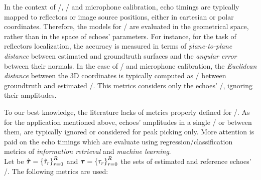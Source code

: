 \mynewline
In the context of \RooGE/, \SSL/ and microphone calibration, echo timings are typically mapped to reflectors or image source positions, either in cartesian or polar coordinates.
Therefore, the models for \AER/ are evaluated in the geometrical space, rather than in the space of echoes' parameters.
For instance, for the task of reflectors localization, the accuracy is measured in terms of \textit{plane-to-plane distance} between estimated and groundtruth surfaces and the \textit{angular error} between their normals.
In the case of \SSL/ and microphone calibration, the \textit{Euclidean distance} between the 3D coordinates is typically computed as \RMSEtxt/ between groundtruth and estimated \DOAs/.
This metrics considers only the echoes' \TOA/, ignoring their amplitudes.

\mynewline
To our best knowledge, the literature lacks of metrics properly defined for \AER/.
As for the application mentioned above, echoes' amplitudes in a single \RIR/ or between them, are typically ignored or considered for peak picking only.
More attention is paid on the echo timings which are evaluate using regression/classification metrics of \textit{information retrieval} and \textit{machine learning}.
\\Let be $\hat{\boldsymbol{\tau}} = \kbrace{\hat{\tau}_\idxEch}_{\idxEch=0}^{\numEchs}$ and $\boldsymbol{\tau} = \kbrace{\tau_\idxEch}_{\idxEch=0}^{\numEchs}$ the sets of estimated and reference echoes' \TOAs/.
The following metrics are used:

